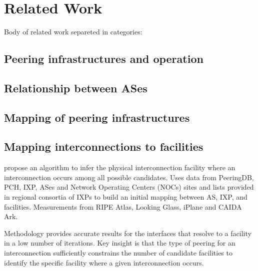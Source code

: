 \chapter{Related Work}\label{cap:related-work}
\thispagestyle{empty}

	Body of related work separeted in categories:

	\section{Peering infrastructures and operation}
	\label{sec:rel-work-peering-infra}

	\cite{Ager:2012, Chatzis:2013, Richter:2014, Kotronis:2017:STC:3131365.3131388, Chatzis:2013:BUL:2504730.2504746, DissectingBrazilianIXP, Augustin:2009:IM:1644893.1644934}

	\section{Relationship between ASes}
	\label{sec:rel-work-relat-as}

	\cite{Giotsas:2014:ICR:2663716.2663743, Giotsas:2015:MPI:2716281.2836122, Luckie:2013:RCC:2504730.2504735}

	\section{Mapping of peering infrastructures}
	\label{sec:rel-work-mapping-peer}

	\cite{Marder:2016:MMA:2987443.2987468, nomikos2016traixroute}

	\section{Mapping interconnections to facilities}
	\label{sec:rel-work-mapping-facility}

	\cite{Giotsas:2015:MPI:2716281.2836122} propose an algorithm to infer the physical interconnection facility where an interconnection occurs among all possible candidates. Uses data from PeeringDB, PCH, IXP, ASes and Network Operating Centers (NOCs) sites and lists provided in regional consortia of IXPs to build an initial mapping between AS, IXP, and facilities.
	Measurements from RIPE Atlas, Looking Glass, iPlane and CAIDA Ark.
	
	Methodology provides accurate results for the interfaces that resolve to a facility in a low number of iterations. Key insight is that the type of peering for an interconnection sufficiently constrains the number of candidate facilities to identify the specific facility where a given interconnection occurs.
	
